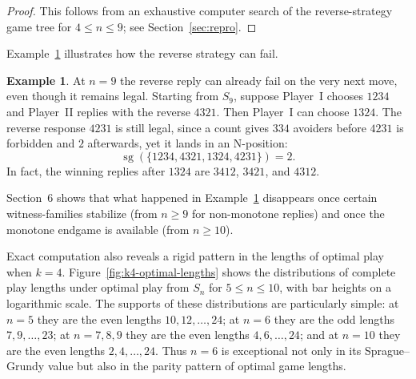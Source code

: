 \documentclass[11pt]{amsart}
\newcommand{\Sym}{S}
\newcommand{\sg}{\operatorname{sg}}
\theoremstyle{plain}
\theoremstyle{definition}
\newtheorem{example}[theorem]{Example}
\theoremstyle{remark}
\begin{document}
\begin{proof}
  This follows from an exhaustive computer search of the reverse-strategy game tree for
  $4 \leq n \leq 9$; see Section~\ref{sec:repro}.
\end{proof}

Example~\ref{ex:n9-reverse-fails} illustrates how the reverse strategy can fail.

\begin{example}\label{ex:n9-reverse-fails}
  At $n=9$ the reverse reply can already fail on the very next move, even though it remains legal.
  Starting from $\Sym_9$, suppose Player~I chooses $1234$ and Player~II replies with the reverse
  $4321$.  Then Player~I can choose $1324$.  The reverse response $4231$ is still legal, since
  a count gives $334$ avoiders before $4231$ is forbidden and $2$ afterwards,
  yet it lands in an N-position:
  \[
    \sg(\{1234,4321,1324,4231\})=2.
  \]
  In fact, the winning replies after $1324$ are $3412$, $3421$, and $4312$.
\end{example}

Section~6 shows that what happened in Example~\ref{ex:n9-reverse-fails} disappears once
certain witness-families stabilize (from $n \geq 9$ for non-monotone replies) and once the monotone endgame is available (from
$n \geq 10$).

Exact computation also reveals a rigid pattern in the lengths of optimal play when $k=4$.
Figure~\ref{fig:k4-optimal-lengths} shows the distributions of complete play lengths under
optimal play from $\Sym_n$ for $5 \leq n \leq 10$, with bar heights on a logarithmic scale.  The
supports of these distributions are particularly simple: at $n=5$ they are the even lengths
$10,12,\ldots,24$; at $n=6$ they are the odd lengths $7,9,\ldots,23$; at $n=7,8,9$ they are the
even lengths $4,6,\ldots,24$; and at $n=10$ they are the even lengths $2,4,\ldots,24$.  Thus
$n=6$ is exceptional not only in its Sprague--Grundy value but also in the parity pattern of
optimal game lengths.
\end{document}
